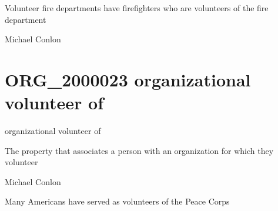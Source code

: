 \documentclass[letterpaper,10pt,english]{sphinxmanual}
\begin{document}
\begin{sphinxShadowBox}

\sphinxAtStartPar
Volunteer fire departments have firefighters who are volunteers of the fire department
\end{sphinxShadowBox}

\begin{sphinxShadowBox}

\sphinxAtStartPar
Michael Conlon 
\end{sphinxShadowBox}
\begin{quote}
\label{\detokenize{doc-ORG_2000023:org-2000023}}\label{\detokenize{doc-ORG_2000023:organizational-volunteer-of}}\label{\detokenize{doc-ORG_2000023:org-2000023}}
\ignorespaces \end{quote}


\section{ORG\_2000023 \sphinxhyphen{} organizational volunteer of}
\label{\detokenize{doc-ORG_2000023:org-2000023-organizational-volunteer-of}}\label{\detokenize{doc-ORG_2000023:index-0}}\label{\detokenize{doc-ORG_2000023::doc}}
\begin{sphinxShadowBox}

\sphinxAtStartPar
organizational volunteer of
\end{sphinxShadowBox}

\begin{sphinxShadowBox}

\sphinxAtStartPar
The property that associates a person with an organization for which they volunteer
\end{sphinxShadowBox}

\begin{sphinxShadowBox}

\sphinxAtStartPar
Michael Conlon 
\end{sphinxShadowBox}

\begin{sphinxShadowBox}

\sphinxAtStartPar
Many Americans have served as volunteers of the Peace Corps
\end{sphinxShadowBox}
\end{document}
